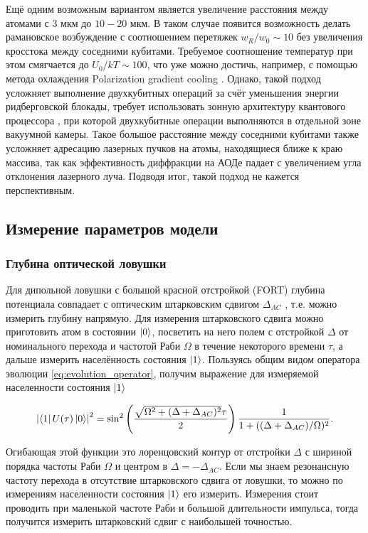 Ещё одним возможным вариантом является увеличение расстояния между атомами с $3\text{ мкм}$ до $10-20\text{ мкм}$. В таком случае появится возможность делать рамановское возбуждение с соотношением перетяжек $w_{R}/w_{0} \sim 10$ без увеличения кросстока между соседними кубитами. Требуемое соотношение температур при этом смягчается до $U_0/kT \sim 100$, что уже можно достичь, например, с помощью метода охлаждения Polarization gradient cooling \cite{PhysRevA.96.033406}. Однако, такой подход усложняет выполнение двухкубитных операций за счёт уменьшения энергии ридберговской блокады, требует использовать зонную архитектуру квантового процессора \cite{Bluvstein:2024aa}, при которой двухкубитные операции выполняются в отдельной зоне вакуумной камеры. Такое большое расстояние между соседними кубитами также усложняет адресацию лазерных пучков на атомы, находящиеся ближе к краю массива, так как эффективность диффракции на АОДе падает с увеличением угла отклонения лазерного луча. Подводя итог, такой подход не кажется перспективным.

\subsection{Измерение параметров модели}

\subsubsection{Глубина оптической ловушки}
\label{sec:trap_depth}

Для дипольной ловушки с большой красной отстройкой (FORT) глубина потенциала совпадает с оптическим штарковским сдвигом $\Delta_{AC}$ \cite{grimm1999optical}, т.е. можно измерить глубину напрямую. Для измерения штарковского сдвига можно приготовить атом в состоянии $\left| 0 \right\rangle$, посветить на него полем с отстройкой $\Delta$ от номинального перехода и частотой Раби $\Omega$ в течение некоторого времени $\tau$, а дальше измерить населённость состояния $\left| 1 \right\rangle$. Пользуясь общим видом оператора эволюции \ref{eq:evolution_operator}, получим выражение для измеряемой населенности состояния $\left| 1 \right\rangle$

\begin{equation}
	\left|\left\langle 1 \right|U(\tau)\left| 0 \right\rangle\right|^2 = \sin^2\left(\frac{\sqrt{\Omega^2+(\Delta+\Delta_{AC})^2}\tau}{2}\right)\frac{1}{1+((\Delta+\Delta_{AC})/\Omega)^2}.
	\label{eq:Stark_measure}
\end{equation}

Огибающая этой функции это лоренцовский контур от отстройки $\Delta$ с шириной порядка частоты Раби $\Omega$ и центром в $\Delta = -\Delta_{AC}$. Если мы знаем резонансную частоту перехода в отсутствие штарковского сдвига от ловушки, то можно по измерениям населенности состояния $\left| 1 \right\rangle$ его измерить. Измерения стоит проводить при маленькой частоте Раби и большой длительности импульса, тогда получится измерить штарковский сдвиг с наибольшей точностью. 

